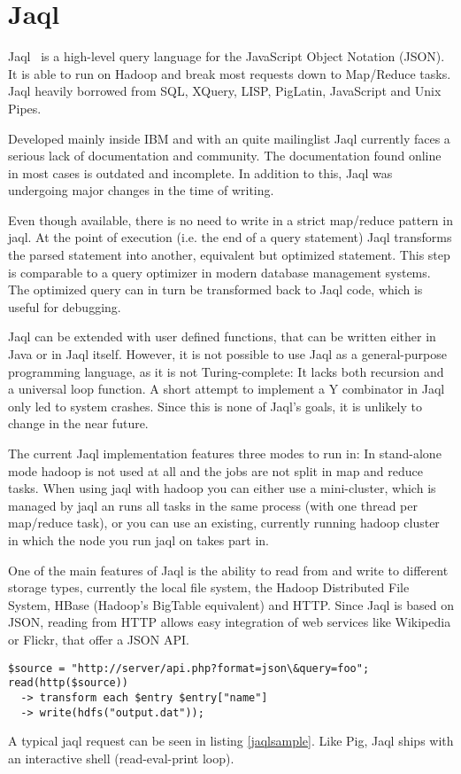 \section{Jaql}

Jaql~\cite{jaqlWebsite} is a high-level query language for the JavaScript Object Notation (JSON).
It is able to run on Hadoop and break most requests down to Map/Reduce tasks.
Jaql heavily borrowed from SQL, XQuery, LISP, PigLatin, JavaScript and Unix Pipes.~\cite{jaqlOverview}

Developed mainly inside IBM and with an quite mailinglist Jaql currently faces
a serious lack of documentation and community. The documentation found online in
most cases is outdated and incomplete. In addition to this, Jaql was undergoing
major changes in the time of writing.

Even though available, there is no need to write in a strict map/reduce pattern in
jaql. At the point of execution (i.e. the end of a query statement) Jaql transforms the
parsed statement into another, equivalent but optimized statement. This step is
comparable to a query optimizer in modern database management systems. The optimized
query can in turn be transformed back to Jaql code, which is useful for debugging.

Jaql can be extended with user defined functions, that can be written either in Java or
in Jaql itself. However, it is not possible to use Jaql as a general-purpose programming
language, as it is not Turing-complete: It lacks both recursion and a universal loop
function. A short attempt to implement a Y combinator in Jaql only led to system crashes.
Since this is none of Jaql's goals, it is unlikely to change in the near future.

The current Jaql implementation features three modes to run in: In stand-alone mode hadoop
is not used at all and the jobs are not split in map and reduce tasks. When using jaql
with hadoop you can either use a mini-cluster, which is managed by jaql an runs all tasks
in the same process (with one thread per map/reduce task), or you can use an existing,
currently running hadoop cluster in which the node you run jaql on takes part in.

One of the main features of Jaql is the ability to read from and write to different
storage types, currently the local file system, the Hadoop Distributed File System,
HBase (Hadoop's BigTable equivalent) and HTTP. Since Jaql is based on JSON, reading
from HTTP allows easy integration of web services like Wikipedia or Flickr, that offer
a JSON API.

\begin{lstlisting}[language=jaql,caption=A sample Jaql query,float,label=jaqlsample]
$source = "http://server/api.php?format=json\&query=foo";
read(http($source)) 
  -> transform each $entry $entry["name"]
  -> write(hdfs("output.dat"));
\end{lstlisting}

A typical jaql request can be seen in listing \ref{jaqlsample}. Like Pig, Jaql ships with an
interactive shell (read-eval-print loop). 